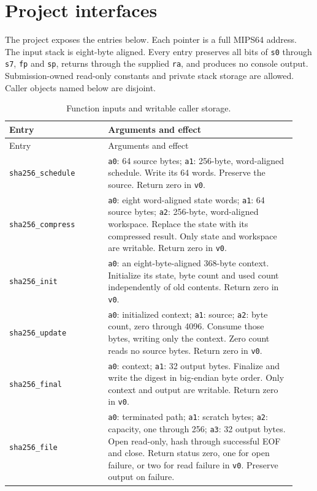 \section*{Project interfaces}
The project exposes the entries below. Each pointer is a full MIPS64 address. The input
stack is eight-byte aligned. Every entry preserves all bits of \texttt{s0} through
\texttt{s7}, \texttt{fp} and \texttt{sp}, returns through the supplied \texttt{ra},
and produces no console output. Submission-owned read-only constants and private stack
storage are allowed. Caller objects named below are disjoint.

\begin{longtable}{p{0.32\linewidth}p{0.61\linewidth}}
\caption{Function inputs and writable caller storage.}\\
\toprule
Entry & Arguments and effect\\
\midrule
\endfirsthead
\toprule Entry & Arguments and effect\\\midrule
\endhead
\texttt{sha256\_schedule} & \texttt{a0}: 64 source bytes; \texttt{a1}: 256-byte,
word-aligned schedule. Write its 64 words. Preserve the source. Return zero in \texttt{v0}.\\
\texttt{sha256\_compress} & \texttt{a0}: eight word-aligned state words;
\texttt{a1}: 64 source bytes; \texttt{a2}: 256-byte, word-aligned workspace.
Replace the state with its compressed result. Only state and workspace are writable.
Return zero in \texttt{v0}.\\
\texttt{sha256\_init} & \texttt{a0}: an eight-byte-aligned 368-byte context.
Initialize its state, byte count and used count independently of old contents.
Return zero in \texttt{v0}.\\
\texttt{sha256\_update} & \texttt{a0}: initialized context; \texttt{a1}: source;
\texttt{a2}: byte count, zero through 4096. Consume those bytes, writing only the
context. Zero count reads no source bytes. Return zero in \texttt{v0}.\\
\texttt{sha256\_final} & \texttt{a0}: context; \texttt{a1}: 32 output bytes.
Finalize and write the digest in big-endian byte order. Only context and output are
writable. Return zero in \texttt{v0}.\\
\texttt{sha256\_file} & \texttt{a0}: terminated path; \texttt{a1}: scratch bytes;
\texttt{a2}: capacity, one through 256; \texttt{a3}: 32 output bytes. Open read-only,
hash through successful EOF and close. Return status zero, one for open failure, or
two for read failure in \texttt{v0}. Preserve output on failure.\\
\bottomrule
\end{longtable}

